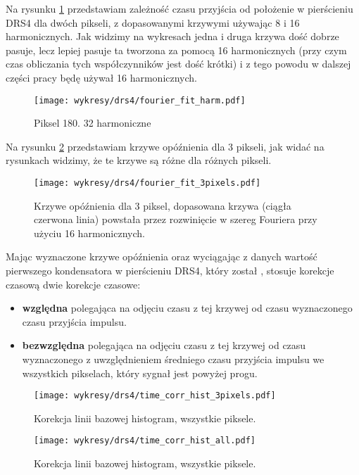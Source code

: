 \documentclass[a4paper,11pt,twoside]{article}
\begin{document}
Na rysunku \ref{fig:fourier_fit_harm} przedstawiam zależność czasu przyjścia od położenie w pierścieniu DRS4 dla dwóch pikseli, z dopasowanymi krzywymi używając 8 i 16 harmonicznych. Jak widzimy na wykresach jedna i druga krzywa dość dobrze pasuje, lecz lepiej pasuje ta tworzona za pomocą 16 harmonicznych (przy czym czas obliczania tych współczynników jest dość krótki) i z tego powodu w dalszej części pracy będę używał 16 harmonicznych.
\begin{figure}[H] 
\centering
\texttt{[image: wykresy/drs4/fourier\_fit\_harm.pdf]}
\caption{Piksel 180. 32 harmoniczne}
\label{fig:fourier_fit_harm}
\end{figure}
Na rysunku \ref{fig:fourier_fit_3} przedstawiam krzywe opóźnienia dla 3 pikseli, jak widać na rysunkach widzimy, że te krzywe są różne dla różnych pikseli. 
\begin{figure}[H] 
\centering
\texttt{[image: wykresy/drs4/fourier\_fit\_3pixels.pdf]}
\caption{Krzywe opóźnienia dla 3 piksel, dopasowana krzywa (ciągła czerwona linia) powstała przez rozwinięcie w szereg Fouriera przy użyciu 16 harmonicznych.}
\label{fig:fourier_fit_3}
\end{figure}
Mając wyznaczone krzywe opóźnienia oraz wyciągając z danych wartość pierwszego kondensatora w pierścieniu DRS4, który został , stosuje korekcje czasową dwie korekcje czasowe:
\begin{itemize}
\item {\bf{względna}} polegająca na odjęciu  czasu z tej krzywej od czasu wyznaczonego czasu przyjścia impulsu.
\item {\bf{bezwzględna}} polegająca na odjęciu czasu z tej krzywej od czasu wyznaczonego z uwzględnieniem średniego czasu przyjścia impulsu we wszystkich pikselach, który sygnał jest powyżej progu.
\end{itemize} 




\begin{figure}[H] 
\centering
\texttt{[image: wykresy/drs4/time\_corr\_hist\_3pixels.pdf]}
\caption{Korekcja linii bazowej histogram, wszystkie piksele.}
\label{fig:muon_image}
\end{figure}

\begin{figure}[H] 
\centering
\texttt{[image: wykresy/drs4/time\_corr\_hist\_all.pdf]}
\caption{Korekcja linii bazowej histogram, wszystkie piksele.}
\label{fig:muon_image}
\end{figure}
\end{document}
